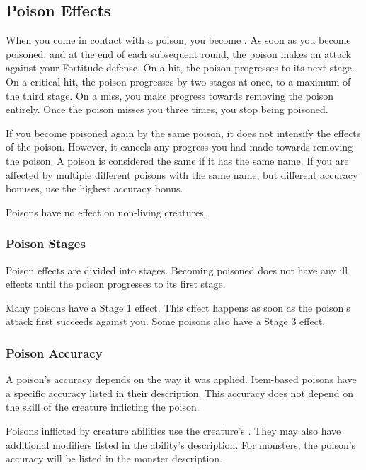     \subsection{Poison Effects}\label{Poison Effects}
        When you come in contact with a poison, you become .
        As soon as you become poisoned, and at the end of each subsequent round, the poison makes an attack against your Fortitude defense.
        On a hit, the poison progresses to its next stage.
        On a critical hit, the poison progresses by two stages at once, to a maximum of the third stage.
        On a miss, you make progress towards removing the poison entirely.
        Once the poison misses you three times, you stop being poisoned.

        If you become poisoned again by the same poison, it does not intensify the effects of the poison.
        However, it cancels any progress you had made towards removing the poison.
        A poison is considered the same if it has the same name.
        If you are affected by multiple different poisons with the same name, but different accuracy bonuses, use the highest accuracy bonus.

        Poisons have no effect on non-living creatures.

        \subsubsection{Poison Stages}
            Poison effects are divided into stages.
            Becoming poisoned does not have any ill effects until the poison progresses to its first stage.

            Many poisons have a Stage 1 effect.
            This effect happens as soon as the poison's attack first succeeds against you.
            Some poisons also have a Stage 3 effect.

        \subsubsection{Poison Accuracy}
            A poison's accuracy depends on the way it was applied.
            Item-based poisons have a specific accuracy listed in their description.
            This accuracy does not depend on the skill of the creature inflicting the poison.

            Poisons inflicted by creature abilities use the creature's .
            They may also have additional modifiers listed in the ability's description.
            For monsters, the poison's accuracy will be listed in the monster description.

